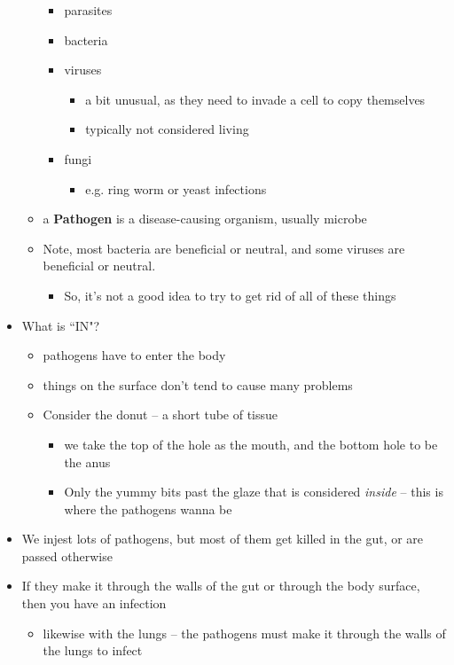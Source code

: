 \documentclass{article}
\theoremstyle{definition}
\begin{document}
\begin{itemize}
\begin{itemize}
\begin{itemize}
					\item parasites
					\item bacteria
					\item viruses
						\begin{itemize}
							\item a bit unusual, as they need to invade a cell to copy themselves
							\item typically not considered living
						\end{itemize}
					\item fungi
						\begin{itemize}
							\item e.g. ring worm or yeast infections
						\end{itemize}
				\end{itemize}
			\item a \textbf{Pathogen}  is a disease-causing organism, usually microbe
			\item Note, most bacteria are beneficial or  neutral, and some viruses are beneficial or neutral.
				\begin{itemize}
					\item So, it's not a good idea to try to get rid of all of these things
				\end{itemize}
		\end{itemize}
	\item What is ``IN"?
		\begin{itemize}
			\item pathogens have to enter the body
			\item things on the surface don't tend to cause many problems
			\item Consider the donut -- a short tube of tissue
				\begin{itemize}
					\item we take the top of the hole as the mouth, and the bottom hole to be the anus
					\item Only the yummy bits past the glaze that is considered \textit{inside}  -- this is where the pathogens wanna be
				\end{itemize}
		\end{itemize}
	\item  We injest lots of pathogens, but most of them get killed in the gut, or are passed otherwise
	\item If they make it through the walls of the gut or through the body surface, then you have an infection
		\begin{itemize}
			\item likewise with the lungs -- the pathogens must make it through the walls of the lungs to infect

\end{itemize}
\end{itemize}
\end{document}
